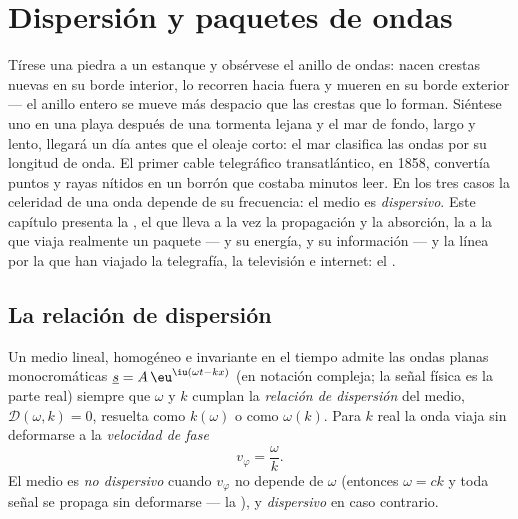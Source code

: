 \chapter{Dispersión y paquetes de ondas}\label{ch:b2:dispersion-wave-packets}

Tírese una piedra a un estanque y obsérvese el anillo de ondas: nacen
crestas nuevas en su borde interior, lo recorren hacia fuera y mueren en
su borde exterior --- el anillo entero se mueve más despacio que las
crestas que lo forman. Siéntese uno en una playa después de una tormenta
lejana y el mar de fondo, largo y lento, llegará un día antes que el
oleaje corto: el mar clasifica las ondas por su longitud de onda. El
primer cable telegráfico transatlántico, en 1858, convertía puntos y rayas
nítidos en un borrón que costaba minutos leer. En los tres casos la
celeridad de una onda depende de su frecuencia: el medio es
\emph{dispersivo}. Este capítulo presenta la , el
 que lleva a la vez la propagación y la absorción,
la  a la que viaja realmente un paquete --- y su
energía, y su información --- y la línea por la que han viajado la
telegrafía, la televisión e internet: el .

\section{La relación de dispersión}

\begin{definition}\label{def:b2:dispersion-wave-packets:relation}
Un medio lineal, homogéneo e invariante en el tiempo admite las ondas
planas monocromáticas $\underline s = A\,\eu^{\iu(\omega t - kx)}$ (en
notación compleja; la señal física es la parte real) siempre que $\omega$ y $k$
cumplan la \emph{relación de dispersión} del medio, $\mathcal D(\omega, k)
= 0$, resuelta como $k(\omega)$ o como $\omega(k)$. Para $k$ real la onda viaja
sin deformarse a la \emph{velocidad de fase}
\[
v_\varphi = \frac\omega k .
\]
El medio es \emph{no dispersivo} cuando $v_\varphi$ no depende de $\omega$
(entonces $\omega = ck$ y toda señal se propaga sin deformarse --- la
), y \emph{dispersivo} en caso contrario.
\end{definition}

